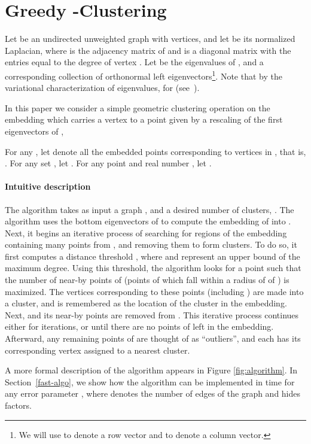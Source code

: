 \documentclass[11pt]{article}
\theoremstyle{plain}
\begin{document}
\section{Greedy \texorpdfstring{}{k}-Clustering}\label{sec:greedy-k-clustering} Let  be an
undirected unweighted graph with  vertices, and let  be its normalized Laplacian, where
 is the adjacency matrix of  and  is a diagonal
matrix with the entries  equal to the degree of vertex
. Let  be the
eigenvalues of , and  a
corresponding collection of orthonormal left eigenvectors\footnote{We will use
 to denote a row vector and  to denote a column vector.}. Note that
by the variational characterization of eigenvalues,
 for 
(see~\cite{Chu97:spectral}).

In this paper we consider a simple geometric clustering operation on the
embedding  which carries a vertex  to a point given by a rescaling of
the first  eigenvectors of ,

For any , let  denote all the embedded points corresponding to
vertices in , that is, . For any set , let . For any point  and real number , let .

\paragraph{Intuitive description}
The algorithm takes as input a graph , and a desired number of clusters, .
The algorithm uses the bottom  eigenvectors  of  to compute the embedding  of  into .
Next, it begins an iterative process of searching for regions of the embedding containing many points from , and removing them to form clusters. To do so, it first computes a distance threshold , where  and  represent an upper bound of the maximum degree.
Using this threshold, the algorithm looks for a point  such that the number of near-by points of  (points of  which fall within a radius of  of ) is maximized.
The vertices corresponding to these points (including ) are made into a cluster, and  is remembered as the location of the cluster in the embedding. Next,  and its near-by points are removed from .
This iterative process continues either for  iterations, or until there are no points of  left in the embedding.
Afterward, any remaining points of  are thought of as ``outliers'', and each has its corresponding vertex assigned to a nearest cluster.

A more formal description of the algorithm appears in Figure \ref{fig:algorithm}. 
In Section~\ref{fast-algo}, we show how the algorithm can be implemented in time  for any error parameter , where  denotes the number of edges of the graph and  hides  factors.
\end{document}
